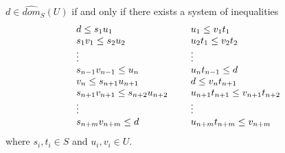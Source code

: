 \documentclass[notes=show]{beamer}
\begin{document}
\begin{frame}%


\begin{theorem}
\label{Zigzag theorem for posemigroups}$d\in \widehat{dom}_{S}(U)$ if and
only if there exists a system of inequalities%
\begin{equation*}
\begin{tabular}{lll}
$d\leq s_{1}u_{1}$ &  & $u_{1}\leq v_{1}t_{1}$ \\ 
$s_{1}v_{1}\leq s_{2}u_{2}$ &  & $u_{2}t_{1}\leq v_{2}t_{2}$ \\ 
$\vdots $ &  & $\vdots $ \\ 
$s_{n-1}v_{n-1}\leq u_{n}$ &  & $u_{n}t_{n-1}\leq d$ \\ 
$v_{n}\leq s_{n+1}u_{n+1}$ &  & $d\leq v_{n}t_{n+1}$ \\ 
$s_{n+1}v_{n+1}\leq s_{n+2}u_{n+2}$ &  & $u_{n+1}t_{n+1}\leq v_{n+1}t_{n+2}$
\\ 
$\vdots $ &  & $\vdots $ \\ 
$s_{n+m}v_{n+m}\leq d$ &  & $u_{n+m}t_{n+m}\leq v_{n+m}$%
\end{tabular}%
\end{equation*}%
where $s_{i},t_{i}\in S$ and $u_{i},v_{i}\in U$.
\end{theorem}

\transboxout%
\end{frame}%
\end{document}
